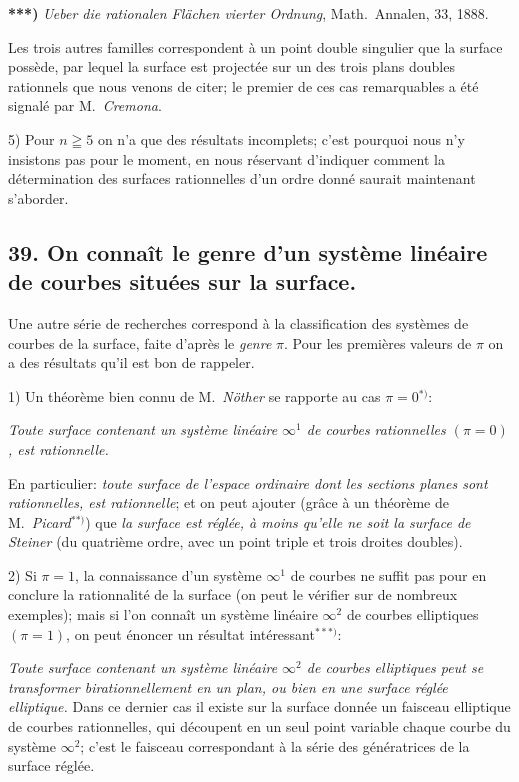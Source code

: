 \documentclass{article}
\begin{document}
\textbf{***)} \emph{Ueber die rationalen Flächen vierter Ordnung}, Math.\ Annalen, 33, 1888.

Les trois autres familles correspondent à un point double singulier que la surface possède, par lequel la surface est projectée sur un des trois plans doubles rationnels que nous venons de citer; le premier de ces cas remarquables a été signalé par M.\ \emph{Cremona}.

5) Pour $n \geqq 5$ on n'a que des résultats incomplets; c'est pourquoi nous n'y insistons pas pour le moment, en nous réservant d'indiquer comment la détermination des surfaces rationnelles d'un ordre donné saurait maintenant s'aborder.

\subsection*{39. On connaît le genre d'un système linéaire de courbes situées sur la surface.}

Une autre série de recherches correspond à la classification des systèmes de courbes de la surface, faite d'après le \emph{genre} $\pi$. Pour les premières valeurs de $\pi$ on a des résultats qu'il est bon de rappeler.

1) Un théorème bien connu de M.\ \emph{Nöther} se rapporte au cas $\pi = 0$${}^{*)}$:

\emph{Toute surface contenant un système linéaire $\infty^{1}$ de courbes rationnelles $(\pi = 0)$, est rationnelle.}

En particulier: \emph{toute surface de l'espace ordinaire dont les sections planes sont rationnelles, est rationnelle}; et on peut ajouter (grâce à un théorème de M.\ \emph{Picard}${}^{**)}$) que \emph{la surface est réglée, à moins qu'elle ne soit la surface de Steiner} (du quatrième ordre, avec un point triple et trois droites doubles).

2) Si $\pi = 1$, la connaissance d'un système $\infty^{1}$ de courbes ne suffit pas pour en conclure la rationnalité de la surface (on peut le vérifier sur de nombreux exemples); mais si l'on connaît un système linéaire $\infty^{2}$ de courbes elliptiques $(\pi = 1)$, on peut énoncer un résultat intéressant${}^{***)}$:

\emph{Toute surface contenant un système linéaire $\infty^{2}$ de courbes elliptiques peut se transformer birationnellement en un plan, ou bien en une surface réglée elliptique.} Dans ce dernier cas il existe sur la surface donnée un faisceau elliptique de courbes rationnelles, qui découpent en un seul point variable chaque courbe du système $\infty^{2}$; c'est le faisceau correspondant à la série des génératrices de la surface réglée.
\end{document}

